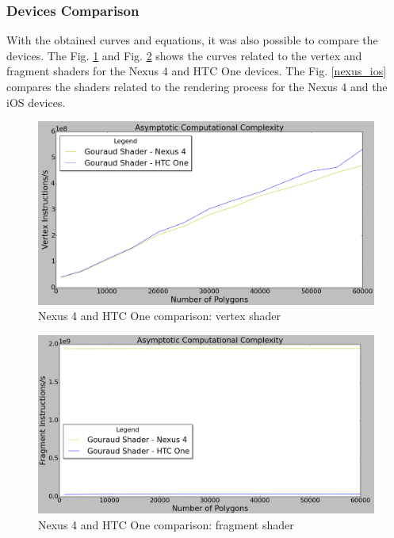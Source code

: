 \documentclass[10pt, conference, compsocconf]{IEEEtran}
\begin{document}
{\subsubsection{Devices Comparison}

With the obtained curves and equations, it was also possible to compare
the devices. The Fig. \ref{nexus_htc_vertex} and Fig. \ref{nexus_htc_fragment} 
shows the curves related to the
vertex and fragment shaders for the Nexus 4 and HTC One devices. The
Fig. \ref{nexus_ios} compares the shaders related to the rendering process
for the Nexus 4 and the iOS devices.

	\begin{figure}[!t]
	\centering
		\includegraphics[keepaspectratio=true,scale=0.27]{vertex_devices_all.png}
	\caption{Nexus 4 and HTC One comparison: vertex shader}
	\label{nexus_htc_vertex}
	\end{figure}
	
	\begin{figure}[!t]
	\centering
		\includegraphics[keepaspectratio=true,scale=0.27]{fragment_devices_all.png}
	\caption{Nexus 4 and HTC One comparison: fragment shader}
	\label{nexus_htc_fragment}
	\end{figure}
	
}
\end{document}

